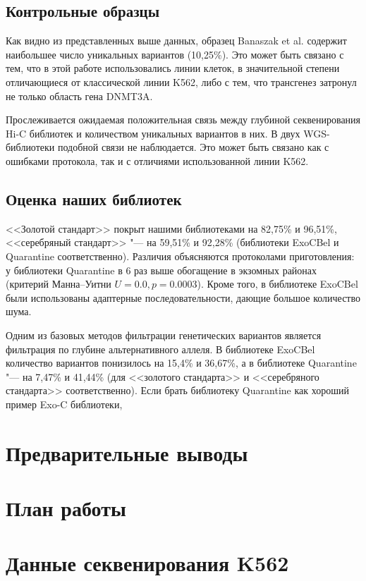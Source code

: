 \documentclass[a4paper,12pt]{article}
\begin{document}
\subsection{Контрольные образцы}

Как видно из представленных выше данных, образец Banaszak et al. содержит наибольшее число уникальных вариантов (10,25\%).
Это может быть связано с тем, что в этой работе использовались линии клеток, в значительной степени отличающиеся от классической линии K562, либо с тем, что трансгенез затронул не только область гена DNMT3A.

Прослеживается ожидаемая положительная связь между глубиной секвенирования Hi-C библиотек и количеством уникальных вариантов в них.
В двух WGS-библиотеки подобной связи не наблюдается.
Это может быть связано как с ошибками протокола, так и с отличиями использованной линии K562.

\subsection{Оценка наших библиотек}

<<Золотой стандарт>> покрыт нашими библиотеками на 82,75\% и 96,51\%, <<серебряный стандарт>> "--- на 59,51\% и 92,28\% (библиотеки ExoCBel и Quarantine соответственно).
Различия объясняются протоколами приготовления: у библиотеки Quarantine в 6 раз выше обогащение в экзомных районах (критерий Манна--Уитни $U = 0.0, p = 0.0003$).
Кроме того, в библиотеке ExoCBel были использованы адаптерные последовательности, дающие большое количество шума.

Одним из базовых методов фильтрации генетических вариантов является фильтрация по глубине альтернативного аллеля.
В библиотеке ExoCBel количество вариантов понизилось на 15,4\% и 36,67\%, а в библиотеке  Quarantine "--- на 7,47\% и 41,44\% (для <<золотого стандарта>> и <<серебряного стандарта>> соответственно).
Если брать библиотеку Quarantine как хороший пример Exo-C библиотеки, 

\section{Предварительные выводы}

\section{План работы}

\newpage
\appendix

\section{Данные секвенирования K562}
\end{document}
